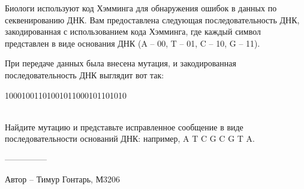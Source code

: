 \question
Биологи используют код Хэмминга для обнаружения ошибок в данных по секвенированию ДНК. Вам предоставлена следующая последовательность ДНК, закодированная с использованием кода Хэмминга, где каждый символ представлен в виде основания ДНК (A -- 00, T -- 01, C -- 10, G -- 11).

При передаче данных была внесена мутация, и закодированная последовательность ДНК выглядит вот так: 
\begin{center}
10001001101001011000101101010
\end{center}
\\
Найдите мутацию и представьте исправленное сообщение в виде последовательности оснований ДНК: например, A T C G C G T A.

---------------

Автор -- Тимур Гонтарь, М3206